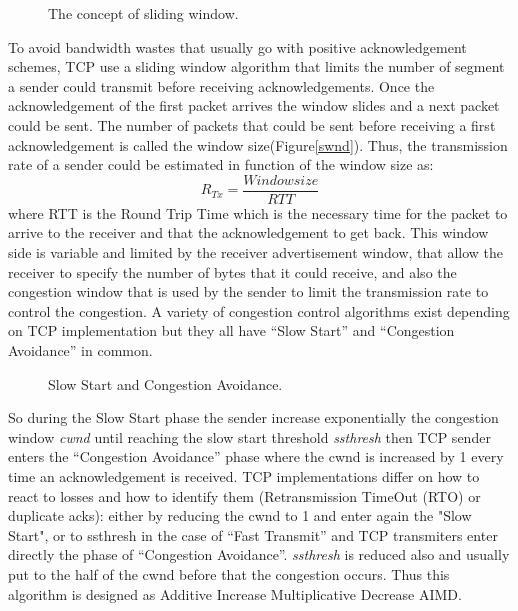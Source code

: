 \begin{figure}[h]
  \begin{center}
\caption{
  The concept of sliding window.
    \label{fig:swnd}
}
 \end{center}
\end{figure}

To avoid bandwidth wastes that usually go with positive acknowledgement schemes, TCP use a sliding window algorithm that limits the number of segment a sender could transmit before receiving acknowledgements. Once the acknowledgement of the first packet arrives the window slides and a next packet could be sent. The number of packets that could be sent before receiving a first acknowledgement is called the window size(Figure\ref{swnd}). Thus, the transmission rate of a sender could be estimated in function of the window size as:
\begin{equation}
R_{Tx} = \frac{Window size}{RTT}
\end{equation}
where RTT is the Round Trip Time which is the necessary time for the packet to arrive to the receiver and that the acknowledgement to get back. This window side is variable and limited by the receiver advertisement window, that allow the receiver to specify the number of bytes that it could receive, and also the congestion window that is used by the sender to limit the transmission rate to control the congestion. A variety of congestion control algorithms exist depending on TCP implementation but they all have “Slow Start” and “Congestion Avoidance” in common. 

 \begin{figure}[h]
  \begin{center}
\caption{
  Slow Start and Congestion Avoidance.
    \label{fig:SSCA}
}
 \end{center}
\end{figure}

So during the Slow Start phase the sender increase exponentially the congestion window {\it cwnd} until reaching the slow start threshold {\it ssthresh} then TCP sender enters the “Congestion Avoidance” phase where the cwnd is increased by 1 every time an acknowledgement is received.
TCP implementations differ on how to react to losses and how to identify them (Retransmission TimeOut (RTO) or duplicate acks): either by reducing the cwnd to 1 and enter again the "Slow Start", or to ssthresh in the case of “Fast Transmit” and TCP transmiters enter directly the phase of  “Congestion Avoidance”. {\it ssthresh} is reduced also and usually put to the half of the cwnd before that the congestion occurs. Thus this algorithm is designed as Additive Increase Multiplicative Decrease AIMD. 

